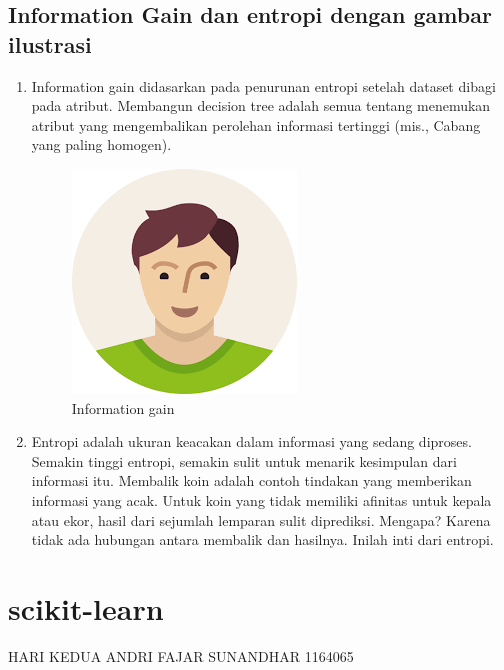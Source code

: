 \subsection{Information Gain dan entropi dengan gambar ilustrasi}
\begin{enumerate}
\item Information gain didasarkan pada penurunan entropi setelah dataset dibagi pada atribut. Membangun decision tree adalah semua tentang menemukan atribut yang mengembalikan perolehan informasi tertinggi (mis., Cabang yang paling homogen).
\begin{figure}[ht]
\centering
\includegraphics[scale=0.5]{figures/AFS/andri8.png}
\caption{Information gain}
\label{contoh}
\end{figure}
\item Entropi adalah ukuran keacakan dalam informasi yang sedang diproses. Semakin tinggi entropi, semakin sulit untuk menarik kesimpulan dari informasi itu. Membalik koin adalah contoh tindakan yang memberikan informasi yang acak. Untuk koin yang tidak memiliki afinitas untuk kepala atau ekor, hasil dari sejumlah lemparan sulit diprediksi. Mengapa? Karena tidak ada hubungan antara membalik dan hasilnya. Inilah inti dari entropi.
\end{enumerate}

\section{scikit-learn}
HARI KEDUA ANDRI FAJAR SUNANDHAR 1164065

